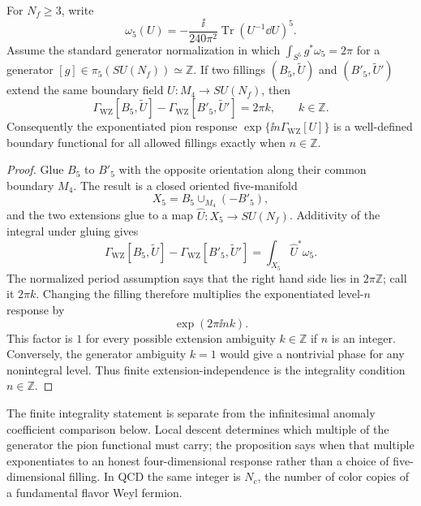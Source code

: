 \begin{proposition}
\label{prop:finite-wz-extension-ambiguity}
For \(N_f\ge3\), write
\[
  \omega_5(U)
  =
  -\frac{\ii}{240\pi^2}
  \operatorname{Tr}(U^{-1}\dd U)^5 .
\]
Assume the standard generator normalization in which
\(\int_{S^5}g^*\omega_5=2\pi\) for a generator
\([g]\in\pi_5(SU(N_f))\simeq\mathbb Z\).  If two fillings
\((B_5,\widetilde U)\) and \((B'_5,\widetilde U')\) extend the same boundary
field \(U:M_4\to SU(N_f)\), then
\[
  \Gamma_{\mathrm{WZ}}[B_5,\widetilde U]
  -
  \Gamma_{\mathrm{WZ}}[B'_5,\widetilde U']
  =
  2\pi k,\qquad k\in\mathbb Z .
\]
Consequently the exponentiated pion response
\(\exp\{\ii n\Gamma_{\mathrm{WZ}}[U]\}\) is a well-defined boundary
functional for all allowed fillings exactly when \(n\in\mathbb Z\).
\end{proposition}

\begin{proof}
Glue \(B_5\) to \(B'_5\) with the opposite orientation along their common
boundary \(M_4\).  The result is a closed oriented five-manifold
\[
  X_5=B_5\cup_{M_4}(-B'_5),
\]
and the two extensions glue to a map \(\widehat U:X_5\to SU(N_f)\).
Additivity of the integral under gluing gives
\[
  \Gamma_{\mathrm{WZ}}[B_5,\widetilde U]
  -
  \Gamma_{\mathrm{WZ}}[B'_5,\widetilde U']
  =
  \int_{X_5}\widehat U^*\omega_5 .
\]
The normalized period assumption says that the right hand side lies in
\(2\pi\mathbb Z\); call it \(2\pi k\).  Changing the filling therefore
multiplies the exponentiated level-\(n\) response by
\[
  \exp(2\pi\ii nk).
\]
This factor is \(1\) for every possible extension ambiguity \(k\in\mathbb Z\)
if \(n\) is an integer.  Conversely, the generator ambiguity \(k=1\) would
give a nontrivial phase for any nonintegral level.  Thus finite
extension-independence is the integrality condition \(n\in\mathbb Z\).
\end{proof}

The finite integrality statement is separate from the infinitesimal anomaly
coefficient comparison below.  Local descent determines which multiple of the
generator the pion functional must carry; the proposition says when that
multiple exponentiates to an honest four-dimensional response rather than a
choice of five-dimensional filling.  In QCD the same integer is \(N_c\), the
number of color copies of a fundamental flavor Weyl fermion.

